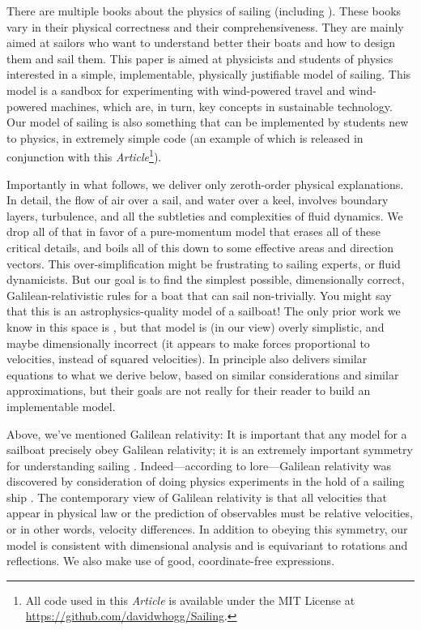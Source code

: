 \documentclass[letterpaper]{article}
\newcommand{\documentname}{\textsl{Article}}
\begin{document}
There are multiple books about the physics of sailing (including \cite{symmetry, explained, sails, pos}).
These books vary in their physical correctness and their comprehensiveness.
They are mainly aimed at sailors who want to understand better their boats and how to design them and sail them.
This paper is aimed at physicists and students of physics interested in a simple, implementable, physically justifiable model of sailing.
This model is a sandbox for experimenting with wind-powered travel and wind-powered machines, which are, in turn, key concepts in sustainable technology.
Our model of sailing is also something that can be implemented by students new to physics, in extremely simple code (an example of which is released in conjunction with this \documentname\footnote{All code used in this \documentname{} is available under the MIT License at \url{https://github.com/davidwhogg/Sailing}.}).

Importantly in what follows, we deliver only zeroth-order physical explanations.
In detail, the flow of air over a sail, and water over a keel, involves boundary layers, turbulence, and all the subtleties and complexities of fluid dynamics.
We drop all of that in favor of a pure-momentum model that erases all of these critical details, and boils all of this down to some effective areas and direction vectors.
This over-simplification might be frustrating to sailing experts, or fluid dynamicists.
But our goal is to find the simplest possible, dimensionally correct, Galilean-relativistic rules for a boat that can sail non-trivially.
You might say that this is an astrophysics-quality model of a sailboat!
The only prior work we know in this space is \cite{tao}, but that model is (in our view) overly simplistic, and maybe dimensionally incorrect (it appears to make forces proportional to velocities, instead of squared velocities).
In principle also \cite{pos} delivers similar equations to what we derive below, based on similar considerations and similar approximations, but their goals are not really for their reader to build an implementable model.

Above, we've mentioned Galilean relativity:
It is important that any model for a sailboat precisely obey Galilean relativity; it is an extremely important symmetry for understanding sailing \cite{symmetry}.
Indeed---according to lore---Galilean relativity was discovered by consideration of doing physics experiments in the hold of a sailing ship \cite{galileo}.
The contemporary view of Galilean relativity is that all velocities that appear in physical law or the prediction of observables must be relative velocities, or in other words, velocity differences.
In addition to obeying this symmetry, our model is consistent with dimensional analysis and is equivariant to rotations and reflections.
We also make use of good, coordinate-free expressions.
\end{document}
